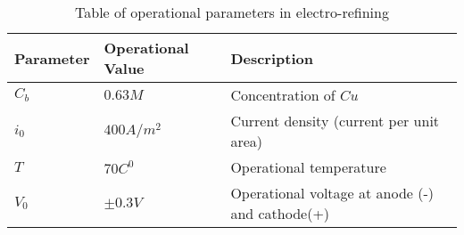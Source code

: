 \begin{table}[]
\begin{tabular}{lll}
Parameter & Operational Value & Description                             \\\hline
$C_b$     & $0.63M$           & Concentration of $Cu$                   \\
$i_0$     & $400 A/m^2$       & Current density (current per unit area) \\
$T$       & $70 C^{0}$          & Operational temperature             \\
$V_0$       & $\pm0.3V$          & Operational voltage at anode (-) and cathode(+)             \\\hline   
\end{tabular}
\caption{Table of operational parameters in electro-refining \cite{schlesinger}}
\end{table}